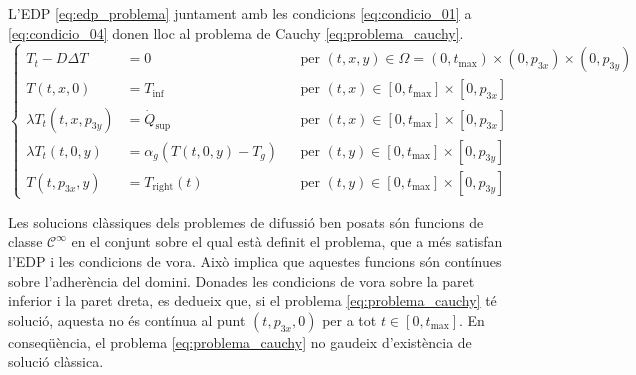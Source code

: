L'EDP \eqref{eq:edp_problema} juntament amb les condicions \eqref{eq:condicio_01} a \eqref{eq:condicio_04} donen lloc al problema de Cauchy \eqref{eq:problema_cauchy}.
\begin{equation} \label{eq:problema_cauchy}
	\left\{
	\begin{aligned}
		T_t - D \Delta T &= 0 & &\text{per } (t,x,y) \in \Omega = (0, t_\text{max}) \times (0, p_{3x}) \times (0, p_{3y}) \\
		T(t,x,0) &= T_\text{inf} & &\text{per } (t,x) \in [0, t_\text{max}] \times [0, p_{3x}] \\
		\lambda T_t (t,x,p_{3y}) &= \dot{Q}_\text{sup} & &\text{per } (t,x) \in [0, t_\text{max}] \times [0, p_{3x}] \\ 
		\lambda T_t(t,0,y) &= \alpha_g (T(t,0,y) - T_g) & &\text{per } (t,y) \in [0, t_\text{max}] \times [0, p_{3y}] \\
		T(t,p_{3x},y) &= T_\text{right}(t) & &\text{per } (t,y) \in [0, t_\text{max}] \times [0, p_{3y}]
	\end{aligned}
	\right.
\end{equation}

Les solucions clàssiques dels problemes de difussió ben posats són funcions de classe $\mathscr{C}^\infty$ en el conjunt sobre el qual està definit el problema, que a més satisfan l'EDP i les condicions de vora. Això implica que aquestes funcions són contínues sobre l'adherència del domini. Donades les condicions de vora sobre la paret inferior i la paret dreta, es dedueix que, si el problema \eqref{eq:problema_cauchy} té solució, aquesta no és contínua al punt $(t, p_{3x}, 0)$ per a tot $t \in [0, t_\text{max}]$. En conseqüència, el problema \eqref{eq:problema_cauchy} no gaudeix d'existència de solució clàssica. 





